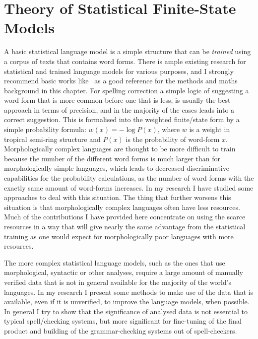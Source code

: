 \documentclass[officiallayout,final]{unihelcompling}
\begin{document}
\section{Theory of Statistical Finite-State Models}
\label{sec:statistical}

A basic statistical language model is a simple structure that can be
\emph{trained} using a corpus of texts that contains word forms. There is ample
existing research for statistical and trained language models for various
purposes, and I strongly recommend basic works
like~\citet{manning1999foundations} as a good reference for the methods and
maths background in this chapter.  For spelling correction a simple logic of
suggesting a word-form that is more common before one that is less, is usually
the best approach in terms of precision, and in the majority of the cases leads
into a correct suggestion. This is formalised into the weighted finite\-/state
form by a simple probability formula: $w(x) = -\log P(x)$, where $w$ is a
weight in tropical semi-ring structure and $P(x)$ is the probability of
word-form $x$.  Morphologically complex languages are thought to be more
difficult to train because the number of the different word forms is much
larger than for morphologically simple languages, which leads to decreased
discriminative capabilities for the probability calculations, as the number of
word forms with the exactly same amount of word-forms increases. In my research
I have studied some approaches to deal with this situation. The thing that
further worsens this situation is that morphologically complex languages often
have less resources.  Much of the contributions I have provided here
concentrate on using the scarce resources in a way that will give nearly the
same advantage from the statistical training as one would expect for
morphologically poor languages with more resources.

The more complex statistical language models, such as the ones that use
morphological, syntactic or other analyses, require a large amount of manually
verified data that is not in general available for the majority of the world's
languages. In my research I present some methods to make use of the data that
is available, even if it is unverified, to improve the language models, when
possible. In general I try to show that the significance of analysed data is
not essential to typical spell\-/checking systems, but more significant for
fine-tuning of the final product and building of the grammar-checking systems
out of spell-checkers.
\end{document}
